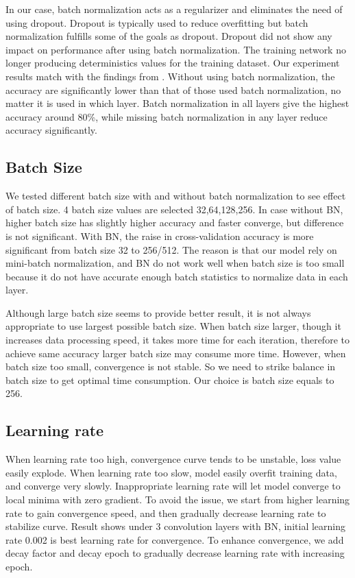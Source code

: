 \documentclass[journal,onecolumn, 12pt]{IEEEtran}
\begin{document}
In our case, batch normalization acts as a regularizer and eliminates the need of using dropout.  Dropout is typically used to reduce overfitting but batch normalization fulfills some of the goals as dropout. Dropout did not show any impact on performance after using batch normalization. The training network no longer producing deterministics values for the training dataset. Our experiment results match with the findings from \cite{bn}. Without using batch normalization, the accuracy are significantly lower than that of those used batch normalization, no matter it is used in which layer. Batch normalization in all layers give the highest accuracy around 80\%, while missing batch normalization in any layer reduce accuracy significantly.

\subsection{Batch Size}
We tested different batch size with and without batch normalization to see effect of batch size. 4 batch size values are selected {32,64,128,256}. 
In case without BN, higher batch size has slightly higher accuracy and faster converge, but difference is not significant. With BN, the raise in cross-validation accuracy is more significant from batch size 32 to 256/512. The reason is that our model rely on mini-batch normalization, and BN do not work well when batch size is too small because it do not have accurate enough batch statistics to normalize data in each layer.

Although large batch size seems to provide better result, it is not always appropriate to use largest possible batch size. When batch size larger, though it increases data processing speed, it takes more time for each iteration, therefore to achieve same accuracy larger batch size may consume more time. However, when batch size too small, convergence is not stable. So we need to strike balance in batch size to get optimal time consumption. Our choice is batch size equals to 256.

\subsection{Learning rate}
When learning rate too high, convergence curve tends to be unstable, loss value easily explode. When learning rate too slow, model easily overfit training data, and converge very slowly. Inappropriate learning rate will let model converge to local minima with zero gradient. To avoid the issue, we start from higher learning rate to gain convergence speed, and then gradually decrease learning rate to stabilize curve. Result shows under 3 convolution layers with BN, initial learning rate 0.002 is best learning rate for convergence. To enhance convergence, we add decay factor and decay epoch to gradually decrease learning rate with increasing epoch.
\end{document}
